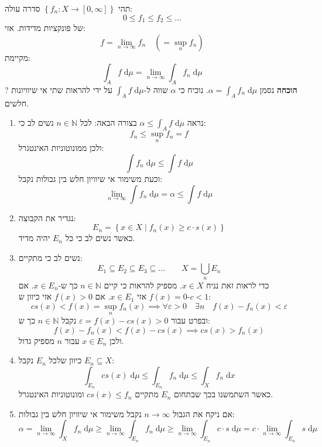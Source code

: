\documentclass{tstextbook}
\begin{document}
\begin{theorem}
תהי \(\left\{  f_{n}:X\to \left[ 0,\infty \right]  \right\}\) סדרה עולה:
$$0\leq f_{1} \leq f_{2} \leq \dots$$
של פונקציות מדידות. אזי:
$$f=\lim_{ n \to \infty } f_{n}\quad \left( =\sup _{n}f_{n} \right)$$
מקיימת:
$$\int_{A}f \;\mathrm{d}\mu = \lim_{ n \to \infty } \int_{A}f_{n}\;\mathrm{d}\mu$$
?
\textbf{הוכחה}
נסמן \(\alpha=\int _{A} f_{n} \;\mathrm{d} \mu\). נוכיח כי \(\alpha\) שווה ל-\(\int _{A}f \;\mathrm{d} \mu\) על ידי להראות שתי אי שיוויונות חלשים.

  \begin{enumerate}
    \item נראה \(\alpha \leq \int_{A} f \;\mathrm{d} \mu\) בצורה הבאה: 
לכל \(n\in \mathbb{N}\) נשים לב כי:
$$f_{n}\leq \sup _{n}f_{n}=f$$
ולכן ממונוטוניות האינטגרל:
$$\int f_{n} \;\mathrm{d} \mu \leq \int f \;\mathrm{d} \mu $$
וכעת משימור אי שיוויון חלש בין גבולות נקבל:
$$\lim_{ n \to \infty } \int f_{n} \;\mathrm{d} \mu=\alpha \leq \int f \;\mathrm{d} \mu  $$


    \item נגדיר את הקבוצה: 
$$E_{n}=\left\{  x \in X\mid f_{n}(x)\geq c\cdot s(x)  \right\}$$
כאשר נשים לב כי כל \(E_{n}\) יהיה מדיד.


    \item נשים לב כי מתקיים: 
$$E_{1} \subseteq E_{2} \subseteq E_{3} \subseteq\dots \qquad X=\bigcup_{n}E_{n}$$
כדי לראות זאת נניח \(x \in X\). מספיק להראות כי קיים \(n \in \mathbb{N}\) כך ש-\(x \in E_{n}\).
אם \(f(x)=0\) אזי \(x \in E_{1}\). אם \(f(x)> 0\) אזי כיוון ש-\(c<1\):
$$cs(x)<f(x)=\sup_{n} f_{n}(x)\implies \forall \varepsilon>0 \quad \exists n \quad f(x)-f_{n}(x)<\varepsilon$$
ובפרט עבור \(\varepsilon=f(x)-cs(x)>0\) נקבל \(n \in \mathbb{N}\) כך ש:
$$f(x)-f_{n}(x)<f(x)-cs(x)\implies cs(x)> f_{n}(x)$$
ולכן \(x \in E_{n}\) עבור \(n\) מספיק גדול.


    \item כיוון שלכל \(E_{n}\) נקבל \(E_{n}\subseteq  X\): 
$$\int_{E_{n}}  c s(x) \;\mathrm{d} \mu \leq\int_{E_{n}} f_{n} \;\mathrm{d} \mu \leq \int _{X} f_{n}\;\mathrm{d} x  $$
כאשר השתמשנו בכך שבתחום \(E_{n}\) מתקיים \(cs(x)\leq f_{n}\) ומונוטוניות האינטגרל.


    \item אם ניקח את הגבול \(n\to \infty\) נקבל משימור אי שיוויון חלש בין גבולות: 
$$\alpha = \lim_{ n \to \infty } \int _{X}f_{n} \;\mathrm{d} \mu \geq \lim_{ n \to \infty } \int _{E_{n}}f_{n} \;\mathrm{d} \mu \geq \lim_{ n \to \infty } \int _{E_{n}}c\cdot s \;\mathrm{d} \mu=c\cdot \lim_{ n \to \infty } \int _{E_{n}}s \;\mathrm{d} \mu   $$



\end{enumerate}
\end{theorem}
\end{document}
